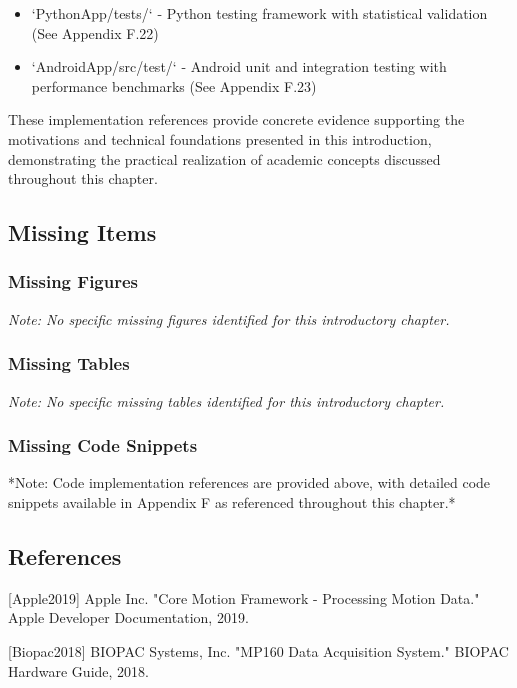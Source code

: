 \documentclass[11pt,a4paper]{article}
\begin{document}
\begin{itemize}
\item `PythonApp/tests/` - Python testing framework with statistical validation (See Appendix F.22)
\item `AndroidApp/src/test/` - Android unit and integration testing with performance benchmarks (See Appendix F.23)

\end{itemize}
These implementation references provide concrete evidence supporting the motivations
and technical foundations presented
in this introduction, demonstrating the practical realization of academic concepts
discussed throughout this chapter.

\subsection{Missing Items}

\subsubsection{Missing Figures}

\textit{Note: No specific missing figures identified for this introductory chapter.}

\subsubsection{Missing Tables}

\textit{Note: No specific missing tables identified for this introductory chapter.}

\subsubsection{Missing Code Snippets}

*Note: Code implementation references are provided above, with detailed code snippets
available in Appendix F as
referenced throughout this chapter.*

\subsection{References}

[Apple2019] Apple Inc.  "Core Motion Framework - Processing Motion Data." Apple
Developer Documentation, 2019.

[Biopac2018] BIOPAC Systems, Inc.  "MP160 Data Acquisition System." BIOPAC Hardware
Guide, 2018.
\end{document}
